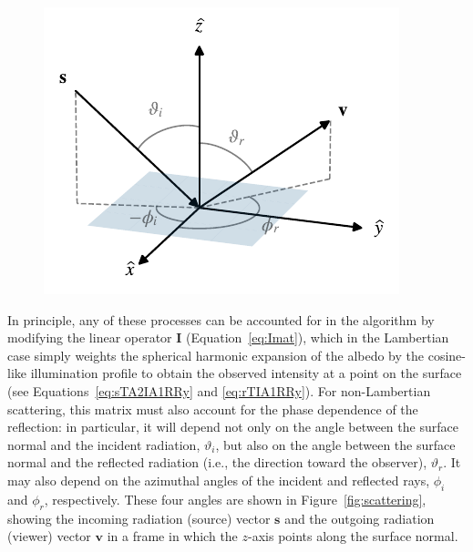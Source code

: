 \documentclass[modern]{aastex62}
\begin{document}
\begin{figure}[t!]
    \begin{centering}
        \includegraphics[width=0.5\linewidth]{figures/scattering.pdf}
    \end{centering}
\end{figure}

In principle, any of these processes can be accounted for in
the \starry algorithm by modifying the linear operator
$\mathbf{I}$ (Equation~\ref{eq:Imat}), which in the Lambertian
case simply weights the spherical harmonic expansion of the albedo
by the cosine-like illumination profile to obtain the observed
intensity at a point on the surface
(see Equations~\ref{eq:sTA2IA1RRy} and \ref{eq:rTIA1RRy}).
For non-Lambertian scattering, this matrix must also account for
the phase dependence of the reflection: in particular, it will depend
not only on the angle between the surface normal and the incident
radiation, $\vartheta_i$, but also on the angle between the surface
normal and the reflected radiation (i.e., the direction toward the
observer), $\vartheta_r$. It may also depend on the azimuthal angles
of the incident and reflected rays, $\phi_i$ and $\phi_r$, respectively.
These four angles are shown in Figure~\ref{fig:scattering}, showing
the incoming radiation (source) vector $\mathbf{s}$ and the outgoing
radiation (viewer) vector $\mathbf{v}$ in a frame in which the $z$-axis
points along the surface normal.
\end{document}
